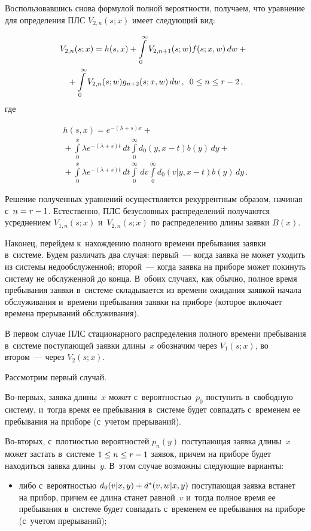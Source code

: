 \begin{multicols}{2}
Воспользовавшись снова формулой полной вероятности, получаем, что
уравнение для определения ПЛС $V_{2,n}(s;x)$ имеет следующий вид:

\noindent
\begin{multline*}
\!\!V_{2,n}(s;x)=h(s,x)+ \int\limits_0^\infty V_{2,n+1}(s;w) f(s;x,w) \, dw
+{}\\
{}+ \int\limits_0^\infty V_{2,n}(s;w) g_{n+2}(s;x,w) \, dw\,,\enskip 0\le n\le r-2\,,
\end{multline*}
где

\noindent
\begin{multline*}
h(s,x)= e^{-(\lambda+s) x}+{}\\
{}+\int\limits_0^x \lambda e^{-(\lambda+s) t}\,dt
\int\limits_0^\infty d_0(y,x-t)b(y)\,dy
+ {}\\
{}+
\int\limits_0^x \lambda e^{-(\lambda+s) t}\,dt
\int\limits_0^\infty \, dv
\int\limits_0^\infty d_0(v|y,x-t) b(y)\, dy\,.
\end{multline*}

Решение полученных уравнений осуществляется рекуррентным образом,
начиная с~$n\hm=r\hm-1$.
Естественно, ПЛС безусловных распределений получаются усреднением
 $V_{1,n}(s;x)$ и~$V_{2,n}(s;x)$ по распределению длины заявки $B(x)$.

Наконец, перейдем к~нахождению полного времени пребывания заявки 
в~системе. Будем различать два случая: первый~--- когда заявка не может
уходить из системы недообслуженной; второй~--- когда заявка на
приборе может покинуть систему не обслуженной до конца. В~обоих
случаях, как обычно, полное время пребывания заявки в~системе
складывается из времени ожидания заявкой начала обслуживания 
и~времени пребывания заявки на приборе (которое включает времена
прерываний обслуживания).

В первом случае ПЛС стационарного распределения полного времени
пребывания в~системе поступающей заявки длины~$x$ обозначим через
$V_1(s;x)$, во втором~--- через $V_2(s;x)$.

\pagebreak

Рассмотрим первый случай.

Во-первых, заявка длины~$x$ может с~вероят\-ностью~$p_0$ поступить
в~свободную систему, и~тогда время ее пребывания в~системе будет совпадать с~временем 
ее пребывания на приборе (с~учетом прерываний).

Во-вторых, с~плотностью вероятностей $p_n(y)$ поступающая заявка
длины~$x$ может застать в~сис\-те\-ме $1 \hm\le n \hm\le r-1$ заявок,
причем на приборе будет находиться заявка длины~$y$. 
В~этом случае возможны следующие варианты:
\begin{itemize}
\item либо с~вероятностью $d_0(v|x,y)\hm+d^*(v,w|x,y)$ поступающая заявка
встанет на прибор, причем ее длина станет равной~$v$ и~тогда полное время
ее пребывания в~системе будет совпадать 
с~временем ее пребывания на приборе (с~учетом прерываний);


\end{itemize}
\end{multicols}
